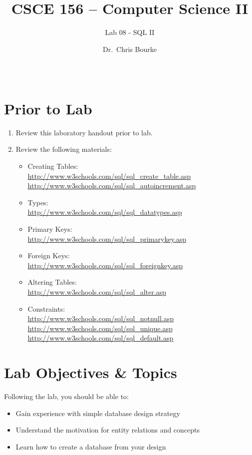 \documentclass[12pt]{scrartcl}
\title{CSCE 156 -- Computer Science II}
\subtitle{Lab 08 - SQL II}
\author{Dr.\ Chris Bourke}
\date{~}
\begin{document}
\maketitle

\section*{Prior to Lab}

\begin{enumerate}
  \item Review this laboratory handout prior to lab.
  \item Review the following materials:
  \begin{itemize}
    \item Creating Tables: \\
    \url{http://www.w3schools.com/sql/sql_create_table.asp}\\
    \url{http://www.w3schools.com/sql/sql_autoincrement.asp}
    \item Types: \\
    \url{http://www.w3schools.com/sql/sql_datatypes.asp}
    \item Primary Keys: \\
    \url{http://www.w3schools.com/sql/sql_primarykey.asp}
    \item Foreign Keys: \\
    \url{http://www.w3schools.com/sql/sql_foreignkey.asp}
    \item Altering Tables: \\
    \url{http://www.w3schools.com/sql/sql_alter.asp}
    \item Constraints: \\
    \url{http://www.w3schools.com/sql/sql_notnull.asp}\\
    \url{http://www.w3schools.com/sql/sql_unique.asp}\\
	\url{http://www.w3schools.com/sql/sql_default.asp}
  \end{itemize}  
\end{enumerate}

\section*{Lab Objectives \& Topics}
Following the lab, you should be able to:
\begin{itemize}
  \item Gain experience with simple database design strategy
  \item Understand the motivation for entity relations and concepts
  \item Learn how to create a database from your design
\end{itemize}
\end{document}
